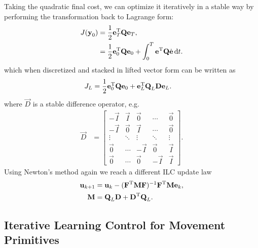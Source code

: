 Taking the quadratic final cost, we can optimize it iteratively in a stable way by performing the transformation back to Lagrange form:
%
\begin{equation}
\begin{aligned}
J(\boldsymbol{\mathrm{y}}_0) &= \frac{1}{2}\boldsymbol{\mathrm{e}}_{T}^{\mathrm{T}}\boldsymbol{\mathrm{Q}}\boldsymbol{\mathrm{e}}_{T}, \\
&= \frac{1}{2}\boldsymbol{\mathrm{e}}_{0}^{\mathrm{T}}\boldsymbol{\mathrm{Q}}\boldsymbol{\mathrm{e}}_{0} + \int_{0}^{T} \boldsymbol{\mathrm{e}}^{\mathrm{T}}\boldsymbol{\mathrm{Q}}\dot{\boldsymbol{\mathrm{e}}} \, \mathrm{d}t.
\end{aligned}
\label{finalCost}
\end{equation}
%
\noindent which when discretized and stacked in lifted vector form can be written as 
%
\begin{equation}
\begin{aligned}
J_L &= \frac{1}{2}\boldsymbol{\mathrm{e}}_{0}^{\mathrm{T}}\boldsymbol{\mathrm{Q}}\boldsymbol{\mathrm{e}}_{0} + \boldsymbol{\mathrm{e}}_L^{\mathrm{T}}\boldsymbol{\mathrm{Q}}_L\boldsymbol{\mathrm{D}}\boldsymbol{\mathrm{e}}_L.
\end{aligned}
\label{costFinalFunctional}
\end{equation}
%
\noindent where $\vec{D}$ is a stable difference operator, e.g.
%
\begin{equation*}
\begin{aligned}
 \vec{D} &= 
 \begin{bmatrix}
  -\vec{I} & \vec{I} & \vec{0} & \cdots & \vec{0} \\
  -\vec{I} & \vec{0} & \vec{I} & \cdots & \vec{0} \\
  \vdots  & \ddots  & \vdots & \ddots & \vdots  \\
  \vec{0} & \cdots & -\vec{I} & \vec{0} & \vec{I} \\
  \vec{0} & \cdots & \vec{0} & -\vec{I} & \vec{I}
 \end{bmatrix}.
\end{aligned}
\end{equation*}
%
\noindent Using Newton's method again we reach a different ILC update law
\begin{equation}
\begin{aligned}
\boldsymbol{\mathrm{u}}_{k+1} &= \boldsymbol{\mathrm{u}}_k - (\boldsymbol{\mathrm{F}}^{\mathrm{T}}\boldsymbol{\mathrm{M}}\boldsymbol{\mathrm{F}})^{-1}\boldsymbol{\mathrm{F}}^{\mathrm{T}}\boldsymbol{\mathrm{M}}\boldsymbol{\mathrm{e}}_k,\\
\boldsymbol{\mathrm{M}} &= \boldsymbol{\mathrm{Q}}_L \boldsymbol{\mathrm{D}} + \boldsymbol{\mathrm{D}}^{\mathrm{T}} \boldsymbol{\mathrm{Q}}_L.
\end{aligned}
\label{ILCmayerForm}
\end{equation}


\subsection{Iterative Learning Control for Movement Primitives}\label{ilcOnDMP} 


